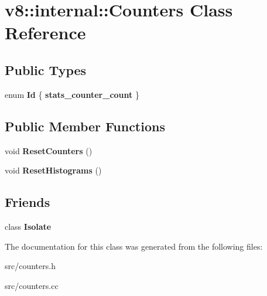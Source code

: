 \hypertarget{classv8_1_1internal_1_1_counters}{}\section{v8\+:\+:internal\+:\+:Counters Class Reference}
\label{classv8_1_1internal_1_1_counters}
\subsection*{Public Types}
\begin{DoxyCompactItemize}
\item 
\hypertarget{classv8_1_1internal_1_1_counters_a77f5e90ac882f961ab168d691da5057c}{}enum {\bfseries Id} \{ {\bfseries stats\+\_\+counter\+\_\+count}
 \}\label{classv8_1_1internal_1_1_counters_a77f5e90ac882f961ab168d691da5057c}

\end{DoxyCompactItemize}
\subsection*{Public Member Functions}
\begin{DoxyCompactItemize}
\item 
\hypertarget{classv8_1_1internal_1_1_counters_acb6463bd09a4e95031ab7c601803403e}{}void {\bfseries Reset\+Counters} ()\label{classv8_1_1internal_1_1_counters_acb6463bd09a4e95031ab7c601803403e}

\item 
\hypertarget{classv8_1_1internal_1_1_counters_ac8b9a827af33b6e3b284c9111b53b3f8}{}void {\bfseries Reset\+Histograms} ()\label{classv8_1_1internal_1_1_counters_ac8b9a827af33b6e3b284c9111b53b3f8}

\end{DoxyCompactItemize}
\subsection*{Friends}
\begin{DoxyCompactItemize}
\item 
\hypertarget{classv8_1_1internal_1_1_counters_aba4f0964bdacf2bbf62cf876e5d28d0a}{}class {\bfseries Isolate}\label{classv8_1_1internal_1_1_counters_aba4f0964bdacf2bbf62cf876e5d28d0a}

\end{DoxyCompactItemize}


The documentation for this class was generated from the following files\+:\begin{DoxyCompactItemize}
\item 
src/counters.\+h\item 
src/counters.\+cc\end{DoxyCompactItemize}
